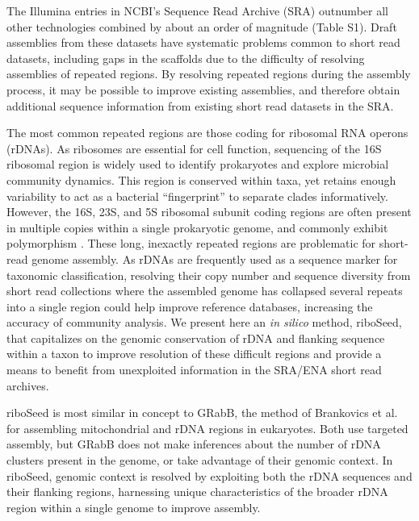 \documentclass[a4,center,fleqn]{NAR}
\begin{document}
The Illumina entries in NCBI's Sequence Read Archive (SRA) \cite{Kodama2012a} outnumber all other technologies combined by about an order of magnitude (Table S1). Draft assemblies from these datasets have systematic problems common to short read datasets, including gaps in the scaffolds due to the difficulty of resolving assemblies of repeated regions\cite{Whiteford2005,Treangen2011}. By resolving repeated regions during the assembly process, it may be possible to improve existing assemblies, and therefore obtain additional sequence information from existing short read datasets in the SRA.



The most common repeated regions are those coding for ribosomal RNA operons (rDNAs). As ribosomes are essential for cell function, sequencing of the 16S ribosomal region is widely used to identify prokaryotes and explore microbial community dynamics\cite{Weisburg1991,Clarridge2004,Woese1990,Case2007}. This region is conserved within taxa, yet retains enough variability to act as a bacterial ``fingerprint'' to separate clades informatively. However, the 16S, 23S, and 5S ribosomal subunit coding regions are often present in multiple copies within a single prokaryotic genome, and commonly exhibit polymorphism \cite{Coenye2003,Moreno2002,Lukjancenko2010,Vetrovsky2013}. These long, inexactly repeated regions\cite{Alkan2011} are problematic for short-read genome assembly. As rDNAs are frequently used as a sequence marker for taxonomic classification, resolving their copy number and sequence diversity from short read collections where the assembled genome has collapsed several repeats into a single region could help improve reference databases, increasing the accuracy of community analysis. We present here an \textit{in silico} method, riboSeed, that capitalizes on the genomic conservation of rDNA and flanking sequence within a taxon to improve resolution of these difficult regions and provide a means to benefit from unexploited information in the SRA/ENA short read archives.


riboSeed is most similar in concept to GRabB, the method of Brankovics et al. \cite{Brankovics2016} for assembling mitochondrial and rDNA regions in eukaryotes. Both use targeted assembly, but GRabB does not make inferences about the number of rDNA clusters present in the genome, or take advantage of their genomic context. In riboSeed, genomic context is resolved by exploiting both the rDNA sequences and their flanking regions, harnessing unique characteristics of the broader rDNA region within a single genome to improve assembly.
\end{document}
